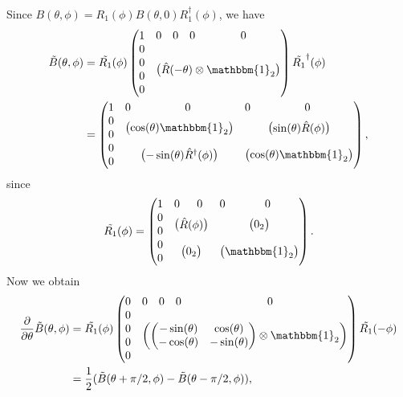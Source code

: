 \documentclass[aps,pra,10pt,twocolumn,groupedaddress,nofootinbib]{revtex4-1}
\theoremstyle{plain}
\newcommand{\pd}[2]{\frac{\partial #1}{\partial #2}}  %
\newcommand{\I}{\mathbbm{1}} %
\newcommand{\Admap}[1]{\tilde{#1}} %
\begin{document}
Since
$B(\theta, \phi) = R_1(\phi) B(\theta, 0) R_1^\dagger(\phi)$,
we have
\begin{align*}
\Admap{B}(\theta, \phi) &=
\Admap{R_1}(\phi)
\begin{pmatrix}
  1 & 0 & 0 & 0 & 0\\
  0 & \block(4,4){\hat{R}(-\theta)\otimes \I_2}\\
  0 & & & &\\
  0 & & & &\\
  0 & & & &
\end{pmatrix}
\Admap{R_1}^\dagger(\phi)\\
&=
\begin{pmatrix}
  1 & 0 & 0 & 0 & 0\\
  0 & \block(2,2){\cos(\theta)\I_2} & \block(2,2){\sin(\theta)\hat{R}(\phi)}\\
  0\\
  0 & \block(2,2){-\sin(\theta)\hat{R}^\dagger(\phi)} & \block(2,2){\cos(\theta)\I_2}\\
  0
\end{pmatrix},
\end{align*}
since
\begin{align*}
\Admap{R_1}(\phi) =
\begin{pmatrix}
  1 & 0 & 0 & 0 & 0\\
  0 & \block(2,2){\hat{R}(\phi)} & \block(2,2){0_2}\\
  0\\
  0 & \block(2,2){0_2} & \block(2,2){\I_2}\\
  0
\end{pmatrix}.
\end{align*}
Now we obtain
\begin{align*}
\pd{}{\theta} \Admap{B}(\theta, \phi)
&=
\Admap{R_1}(\phi)
\begin{pmatrix}
  0 & 0 & 0 & 0 & 0\\
  0 & \block(4,4){
    \begin{pmatrix}
      -\sin(\theta) & \cos(\theta) \\
      -\cos(\theta) & -\sin(\theta)
    \end{pmatrix} \otimes \I_2
  }\\
  0 & & & &\\
  0 & & & &\\
  0 & & & &
\end{pmatrix}
\Admap{R_1}(-\phi)\\
&=
\frac{1}{2}(\Admap{B}(\theta+\pi/2, \phi)
-\Admap{B}(\theta-\pi/2, \phi)),
\end{align*}
\end{document}
